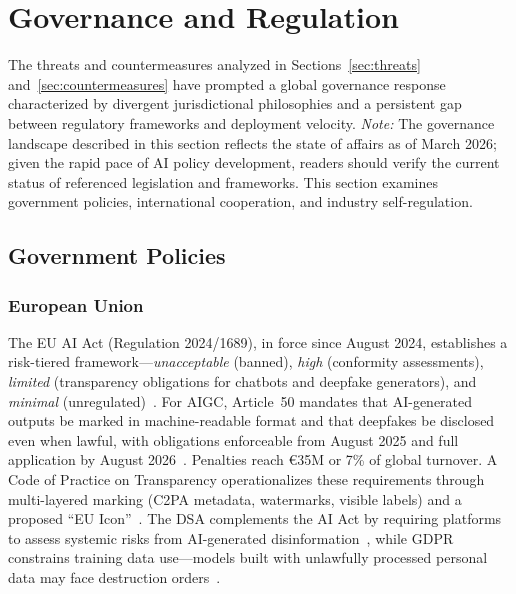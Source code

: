 
\section{Governance and Regulation}
\label{sec:governance}

The threats and countermeasures analyzed in Sections~\ref{sec:threats} and~\ref{sec:countermeasures} have prompted a global governance response characterized by divergent jurisdictional philosophies and a persistent gap between regulatory frameworks and deployment velocity. \emph{Note:} The governance landscape described in this section reflects the state of affairs as of March 2026; given the rapid pace of AI policy development, readers should verify the current status of referenced legislation and frameworks. This section examines government policies, international cooperation, and industry self-regulation.


\subsection{Government Policies}
\label{sec:gov-policy}

\subsubsection{European Union}
\label{sec:gov-eu}

The EU AI Act (Regulation 2024/1689), in force since August 2024, establishes a risk-tiered framework---\emph{unacceptable} (banned), \emph{high} (conformity assessments), \emph{limited} (transparency obligations for chatbots and deepfake generators), and \emph{minimal} (unregulated)~\cite{euaiact2024}. For AIGC, Article~50 mandates that AI-generated outputs be marked in machine-readable format and that deepfakes be disclosed even when lawful, with obligations enforceable from August 2025 and full application by August 2026~\cite{euaiact_art50}. Penalties reach \euro35M or 7\% of global turnover. A Code of Practice on Transparency operationalizes these requirements through multi-layered marking (C2PA metadata, watermarks, visible labels) and a proposed ``EU Icon''~\cite{eucode2025}. The DSA complements the AI Act by requiring platforms to assess systemic risks from AI-generated disinformation~\cite{dsa2024}, while GDPR constrains training data use---models built with unlawfully processed personal data may face destruction orders~\cite{cnil2025,edpb2024}.


